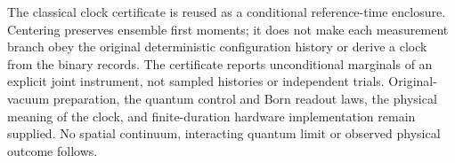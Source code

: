 The classical clock certificate is reused as a conditional reference-time
enclosure. Centering preserves ensemble first moments; it does not make
each measurement branch obey the original deterministic configuration
history or derive a clock from the binary records. The certificate reports
unconditional marginals of an explicit joint instrument, not sampled
histories or independent trials. Original-vacuum preparation, the quantum
control and Born readout laws, the physical meaning of the clock, and
finite-duration hardware implementation remain supplied. No spatial
continuum, interacting quantum limit or observed physical outcome follows.
